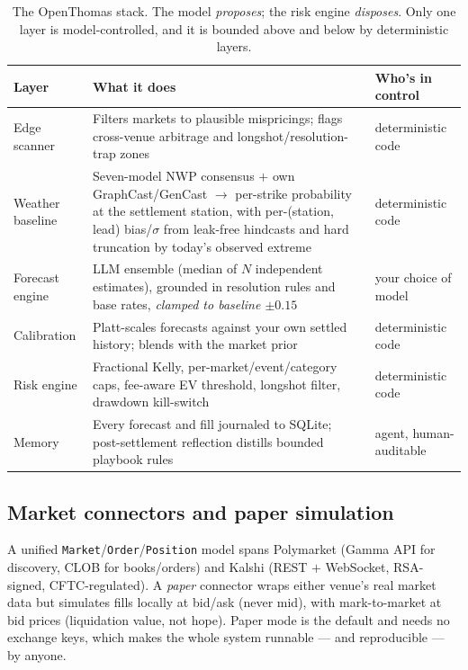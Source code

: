 \documentclass[10pt,twocolumn]{article}
\begin{document}
\begin{table}[t]
\centering
\small
\begin{tabular}{@{}p{2.4cm}p{9.5cm}p{3.0cm}@{}}
\toprule
\textbf{Layer} & \textbf{What it does} & \textbf{Who's in control} \\
\midrule
Edge scanner & Filters markets to plausible mispricings; flags cross-venue arbitrage and longshot/resolution-trap zones & deterministic code \\
Weather baseline & Seven-model NWP consensus $+$ own GraphCast/GenCast $\to$ per-strike probability at the settlement station, with per-(station, lead) bias/$\sigma$ from leak-free hindcasts and hard truncation by today's observed extreme & deterministic code \\
Forecast engine & LLM ensemble (median of $N$ independent estimates), grounded in resolution rules and base rates, \emph{clamped to baseline $\pm 0.15$} & your choice of model \\
Calibration & Platt-scales forecasts against your own settled history; blends with the market prior & deterministic code \\
Risk engine & Fractional Kelly, per-market/event/category caps, fee-aware EV threshold, longshot filter, drawdown kill-switch & deterministic code \\
Memory & Every forecast and fill journaled to SQLite; post-settlement reflection distills bounded playbook rules & agent, human-auditable \\
\bottomrule
\end{tabular}
\caption{The OpenThomas stack. The model \emph{proposes}; the risk engine
\emph{disposes}. Only one layer is model-controlled, and it is bounded above and
below by deterministic layers.}
\label{tab:layers}
\end{table}

\subsection{Market connectors and paper simulation}
A unified \texttt{Market}/\texttt{Order}/\texttt{Position} model spans Polymarket
(Gamma API for discovery, CLOB for books/orders) and Kalshi (REST $+$ WebSocket,
RSA-signed, CFTC-regulated). A \emph{paper} connector wraps either venue's real
market data but simulates fills locally at bid/ask (never mid), with
mark-to-market at bid prices (liquidation value, not hope). Paper mode is the
default and needs no exchange keys, which makes the whole system runnable ---
and reproducible --- by anyone.
\end{document}
